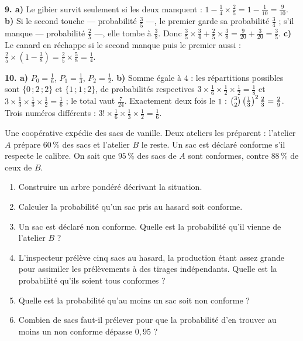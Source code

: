 \begin{corrige}[annales]
\textbf{9. a)} Le gibier survit seulement si les deux manquent :
$1-\frac14 \times \frac25 = 1-\frac{1}{10} = \frac{9}{10}$.
\textbf{b)} Si le second touche — probabilité $\frac35$ —, le premier garde sa
probabilité $\frac34$ ; s'il manque — probabilité $\frac25$ —, elle tombe à
$\frac38$. Donc
$\frac35 \times \frac34+\frac25 \times \frac38 = \frac{9}{20}+\frac{3}{20}
= \frac35$.
\textbf{c)} Le canard en réchappe si le second manque puis le premier aussi :
$\frac25 \times \left(1-\frac38\right) = \frac25 \times \frac58 = \frac14$.

\textbf{10. a)} $P_{0} = \frac16$, $P_{1} = \frac13$, $P_{2} = \frac12$.
\textbf{b)} Somme égale à $4$ : les répartitions possibles sont
$\{0\,;2\,;2\}$ et $\{1\,;1\,;2\}$, de probabilités respectives
$3 \times \frac16 \times \frac12 \times \frac12 = \frac18$ et
$3 \times \frac13 \times \frac13 \times \frac12 = \frac16$ ; le total vaut
$\frac{7}{24}$. Exactement deux fois le $1$ :
$\combi{2}{3}\left(\frac13\right)^{2}\frac23 = \frac29$. Trois numéros
différents : $3! \times \frac16 \times \frac13 \times \frac12 = \frac16$.
\end{corrige}

\begin{jecherche}
Une coopérative expédie des sacs de vanille. Deux ateliers les préparent :
l'atelier $A$ prépare $60\,\%$ des sacs et l'atelier $B$ le reste. Un sac est
déclaré conforme s'il respecte le calibre. On sait que $95\,\%$ des sacs de
$A$ sont conformes, contre $88\,\%$ de ceux de $B$.

\begin{enumerate}[label=\textbf{\arabic*.}, leftmargin=*, itemsep=0.3em]
  \item Construire un arbre pondéré décrivant la situation.
  \item Calculer la probabilité qu'un sac pris au hasard soit conforme.
  \item Un sac est déclaré non conforme. Quelle est la probabilité qu'il
        vienne de l'atelier $B$ ?
  \item L'inspecteur prélève cinq sacs au hasard, la production étant assez
        grande pour assimiler les prélèvements à des tirages indépendants.
        Quelle est la probabilité qu'ils soient tous conformes ?
  \item Quelle est la probabilité qu'au moins un sac soit non conforme ?
  \item Combien de sacs faut-il prélever pour que la probabilité d'en trouver
        au moins un non conforme dépasse $0{,}95$ ?
\end{enumerate}
\end{jecherche}

